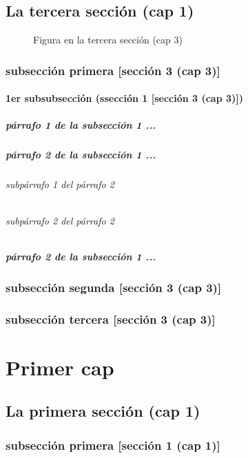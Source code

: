 \documentclass[12pt,a4paper]{report}
\begin{document}
\section{La tercera sección (cap 1)}
\begin{figure}[H]
\caption{Figura en la tercera sección (cap 3)}
\end{figure}
\subsection{subsección primera [sección 3 (cap 3)]}
\subsubsection{1er subsubsección (ssección 1 [sección 3 (cap 3)])}
\paragraph{párrafo 1 de la subsección 1 ...}
\paragraph{párrafo 2 de la subsección 1 ...}
\subparagraph{subpárrafo 1 del párrafo 2}
\subparagraph{subpárrafo 2 del párrafo 2}
\paragraph{párrafo 2 de la subsección 1 ...}
\subsection{subsección segunda [sección 3 (cap 3)]}
\subsection{subsección tercera [sección 3 (cap 3)]}



\chapter*{Primer cap}
\section*{La primera sección (cap 1)}
\subsection*{subsección primera [sección 1 (cap 1)]}
\end{document}
